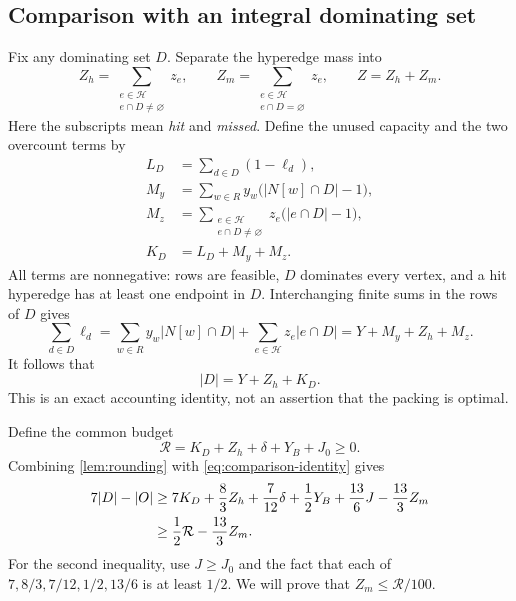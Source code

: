 \documentclass[11pt,a4paper]{article}
\theoremstyle{definition}
\theoremstyle{remark}
\newcommand{\HH}{\mathcal H}
\newcommand{\budget}{\mathcal R}
\begin{document}
\subsection{Comparison with an integral dominating set}

Fix any dominating set \(D\). Separate the hyperedge mass into
\[
 Z_h=\sum_{\substack{e\in\HH\\e\cap D\ne\varnothing}}z_e,\qquad
 Z_m=\sum_{\substack{e\in\HH\\e\cap D=\varnothing}}z_e,
 \qquad Z=Z_h+Z_m .
\]
Here the subscripts mean \emph{hit} and \emph{missed}. Define the unused
capacity and the two overcount terms by
\begin{equation}\label{eq:comparison-slack}
 \begin{aligned}
 L_D&=\sum_{d\in D}(1-\ell_d),\\
 M_y&=\sum_{w\in R}y_w\bigl(|N[w]\cap D|-1\bigr),\\
 M_z&=\sum_{\substack{e\in\HH\\e\cap D\ne\varnothing}}
                  z_e\bigl(|e\cap D|-1\bigr),\\
 K_D&=L_D+M_y+M_z .
 \end{aligned}
\end{equation}
All terms are nonnegative: rows are feasible, \(D\) dominates every
vertex, and a hit hyperedge has at least one endpoint in \(D\).
Interchanging finite sums in the rows of \(D\) gives
\[
 \sum_{d\in D}\ell_d
 =\sum_{w\in R}y_w|N[w]\cap D|
   +\sum_{e\in\HH}z_e|e\cap D|
 =Y+M_y+Z_h+M_z .
\]
It follows that
\begin{equation}\label{eq:comparison-identity}
 |D|=Y+Z_h+K_D.
\end{equation}
This is an exact accounting identity, not an assertion that the packing
is optimal.

Define the common budget
\begin{equation}\label{eq:budget}
 \budget=K_D+Z_h+\delta+Y_B+J_0\geq0.
\end{equation}
Combining \cref{lem:rounding} with \eqref{eq:comparison-identity} gives
\begin{align}
 7|D|-|O|
 &\geq7K_D+\frac83Z_h+\frac7{12}\delta
          +\frac12Y_B+\frac{13}{6}J-\frac{13}{3}Z_m\notag\\
 &\geq\frac12\budget-\frac{13}{3}Z_m.
 \label{eq:budget-gap}
\end{align}
For the second inequality, use \(J\geq J_0\) and the fact that each
of \(7,8/3,7/12,1/2,13/6\) is at least \(1/2\).
We will prove that \(Z_m\leq\budget/100\).
\end{document}
